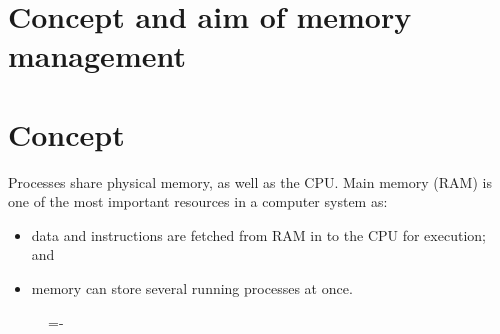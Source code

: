 \documentclass[a4paper]{systems-software}
\begin{document}
\section{Concept and aim of memory management}

\section*{Concept}

Processes share physical memory, as well as the CPU. Main memory (RAM) is one of the most important resources in a computer system as:
\begin{itemize}
	\item data and instructions are fetched from RAM in to the CPU for execution; and
	\item memory can store several running processes at once.
\end{itemize}

\begin{figure}[H]
  \lineskip=-\fboxrule
\end{figure}
\end{document}
